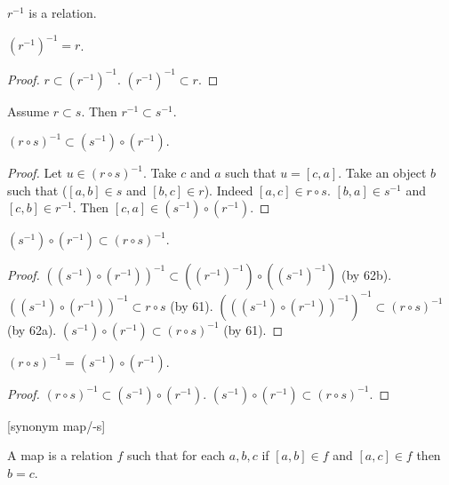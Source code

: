 \documentclass[a4paper,draft]{amsproc}
\begin{document}
\begin{forthel}
\begin{lemma}
$r^{-1}$ is a relation.
\end{lemma}

\begin{theorem}
$(r^{-1})^{-1} = r$.
\end{theorem}
\begin{proof}
$r \subset (r^{-1})^{-1}$.
$(r^{-1})^{-1} \subset r$.
\end{proof}

\begin{lemma}
Assume $r \subset s$. Then $r^{-1} \subset s^{-1}$.
\end{lemma}


\begin{lemma}
$(r \circ s)^{-1} \subset (s^{-1}) \circ (r^{-1})$.
\end{lemma}
\begin{proof}
Let $u \in (r \circ s)^{-1}$.
Take $c$ and $a$ such that $u = [c,a]$.
Take an object $b$ such that ($[a,b] \in s$ and $[b,c] \in r$).
Indeed $[a,c] \in r \circ s$.
$[b,a] \in s^{-1}$ and $[c,b] \in r^{-1}$.
Then $[c,a] \in (s^{-1}) \circ (r^{-1})$.
\end{proof}

\begin{lemma}
$(s^{-1}) \circ (r^{-1}) \subset (r \circ s)^{-1}$.
\end{lemma}
\begin{proof}
$((s^{-1}) \circ (r^{-1}))^{-1} \subset ((r^{-1})^{-1}) \circ ((s^{-1})^{-1})$ (by 62b).
$((s^{-1}) \circ (r^{-1}))^{-1} \subset r \circ s$ (by 61).
$(((s^{-1}) \circ (r^{-1}))^{-1})^{-1} \subset (r \circ s)^{-1}$ (by 62a).
$(s^{-1}) \circ (r^{-1}) \subset (r \circ s)^{-1}$ (by 61).
\end{proof}

\begin{theorem}
$(r \circ s)^{-1} = (s^{-1}) \circ (r^{-1})$.
\end{theorem}
\begin{proof}
$(r \circ s)^{-1} \subset (s^{-1}) \circ (r^{-1})$.
$(s^{-1}) \circ (r^{-1}) \subset (r \circ s)^{-1}$.
\end{proof}




[synonym map/-s]
\begin{definition}
A map is a relation $f$ such that for each $a, b, c$
if $[a,b] \in f$ and $[a,c] \in f$ then $b = c$.
\end{definition}


\end{forthel}
\end{document}
